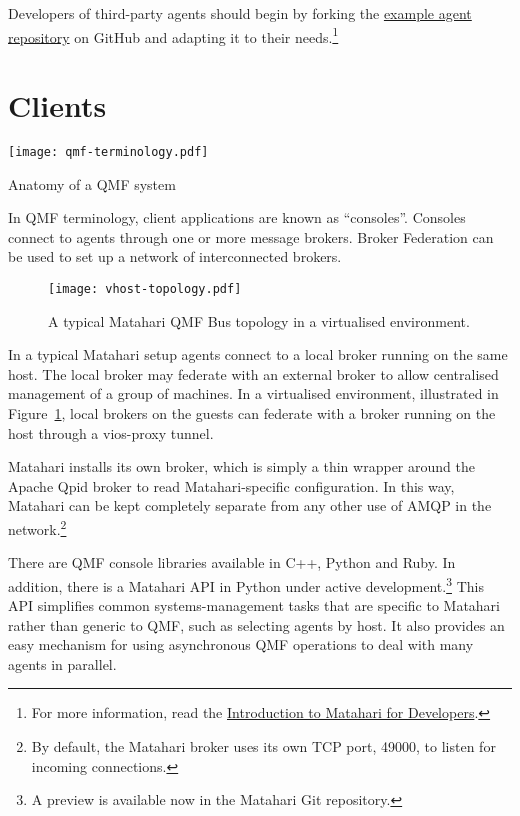 \documentclass{tufte-handout}
\begin{document}
Developers of third-party agents should begin by forking the \href{https://github.com/matahari/matahari-agent-example}{example agent repository} on GitHub and adapting it to their needs.\footnote{For more information, read the \href{https://github.com/downloads/zaneb/presentations/matahari-for-developers-7db27de.pdf}{Introduction to Matahari for Developers}.}

\section{Clients}

\begin{marginfigure}
\texttt{[image: qmf-terminology.pdf]}
\caption{Anatomy of a QMF system}
\label{fig:qmf-terminology}
\end{marginfigure}

In QMF terminology, client applications are known as ``consoles''. Consoles connect to agents through one or more message brokers. Broker Federation can be used to set up a network of interconnected brokers.

\begin{figure}[b]
\texttt{[image: vhost-topology.pdf]}
\caption{A typical Matahari QMF Bus topology in a virtualised environment.}
\label{fig:vhost-topology}
\end{figure}

In a typical Matahari setup agents connect to a local broker running on the same host. The local broker may federate with an external broker to allow centralised management of a group of machines.
In a virtualised environment, illustrated in Figure~\ref{fig:vhost-topology}, local brokers on the guests can federate with a broker running on the host through a  vios-proxy tunnel.
 
Matahari installs its own broker, which is simply a thin wrapper around the Apache Qpid broker to read Matahari-specific configuration. In this way, Matahari can be kept completely separate from any other use of AMQP in the network.\footnote{By default, the Matahari broker uses its own TCP port, 49000, to listen for incoming connections.}

There are QMF console libraries available in C++, Python and Ruby.
In addition, there is a Matahari API in Python under active development.\footnote{A preview is available now in the Matahari Git repository.} This API simplifies common systems-management tasks that are specific to Matahari rather than generic to QMF, such as selecting agents by host. It also provides an easy mechanism for using asynchronous QMF operations to deal with many agents in parallel.
\end{document}
